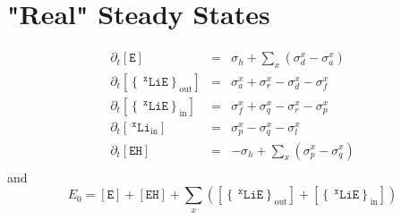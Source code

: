 \documentclass[aps,onecolumn,11pt]{revtex4}
\newcommand{\mychem}[1]{\mathtt{#1}}
\newcommand{\myconc}[1]{\left\lbrack{#1}\right\rbrack}
\newcommand{\spLi}[1]{{~^{\mychem{#1}}\mychem{Li}}}
\newcommand{\spEout}{\mychem{E}}
\newcommand{\Eout}{\myconc{\spEout}}
\newcommand{\spLiEin}[1]{\left\lbrace\spLi{#1}\spEout\right\rbrace_{\mathrm{in}}}
\newcommand{\LiEin}[1]{\myconc{\spLiEin{#1}}}
\newcommand{\spLiEout}[1]{\left\lbrace\spLi{#1}\spEout\right\rbrace_{\mathrm{out}}}
\newcommand{\LiEout}[1]{\myconc{\spLiEout{#1}}}
\newcommand{\spLiIn}[1]{{\spLi{#1}}_{\mathrm{in}}}
\newcommand{\LiIn}[1]{\myconc{\spLiIn{#1}}}
\newcommand{\spEHin}{\mychem{EH}}
\newcommand{\EHin}{\myconc{\spEHin}}
\begin{document}
\section{"Real" Steady States}
\begin{equation}
	\begin{array}{rcl}
	\partial_t  \Eout & = & \sigma_h  + \sum_x\left(\sigma_d^x - \sigma_a^x\right)\\
	\partial_t  \LiEout{x} & = & \sigma_a^x+\sigma_r^x - \sigma_d^x-\sigma_f^x\\
	\partial_t  \LiEin{x}  & = & \sigma_f^x + \sigma_q^x - \sigma_r^x - \sigma_p^x\\
	\partial_t  \LiIn{x}   & = &  \sigma_p^x - \sigma_q^x - \sigma_l^x\\
	\partial_t  \EHin & = & -\sigma_h + \sum_x\left(\sigma_p^x - \sigma_q^x\right)\\
	\end{array}
\end{equation}
and
\begin{equation}
	E_0 = \Eout + \EHin + \sum_x \left(\LiEout{x} + \LiEin{x} \right)
\end{equation}
\end{document}
